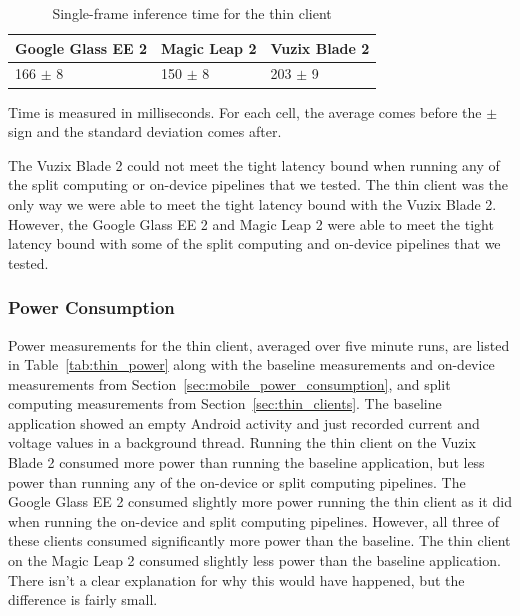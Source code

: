 \begin{table}
\begin{tabular}{|l|l|l|}
  \hline
  Google Glass EE 2 & Magic Leap 2 & Vuzix Blade 2\\
  \hline
  \hline
  166 $\pm$ 8 & 150 $\pm$ 8 & 203 $\pm$ 9\\
  \hline
\end{tabular}
\begin{captiontext}
  Time is measured in milliseconds.
  For each cell, the average comes before the $\pm$ sign and the standard
  deviation comes after.
  \end{captiontext}
  \caption{
    Single-frame inference time for the thin client
  }\label{tab:thin_times}
\end{table}

The Vuzix Blade 2 could not meet the tight latency bound when running any of the
split computing or on-device pipelines that we tested.
The thin client was the only way we were able to meet the tight latency bound
with the Vuzix Blade 2.
However, the Google Glass EE 2 and Magic Leap 2 were able to meet the tight
latency bound with some of the split computing and on-device pipelines that we
tested.

\subsubsection{Power Consumption}

Power measurements for the thin client, averaged over five minute runs, are
listed in Table~{\ref{tab:thin_power}} along with the baseline measurements and
on-device measurements from Section~{\ref{sec:mobile_power_consumption}},
and split computing measurements from Section~{\ref{sec:thin_clients}}.
The baseline application showed an empty Android activity and just recorded
current and voltage values in a background thread.
Running the thin client on the Vuzix Blade 2 consumed more power than running
the baseline application, but less power than running any of the on-device or
split computing pipelines.
The Google Glass EE 2 consumed slightly more power running the thin client
as it did when running the on-device and split computing pipelines.
However, all three of these clients consumed significantly more power than the
baseline.
The thin client on the Magic Leap 2 consumed slightly less power than the
baseline application.
There isn't a clear explanation for why this would have happened, but the
difference is fairly small.

